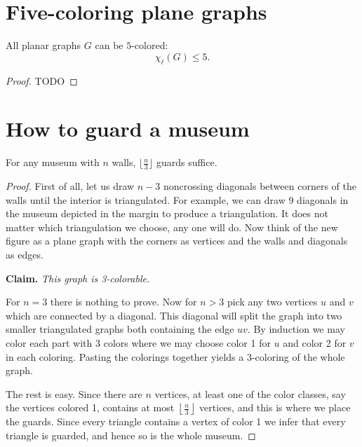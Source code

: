 \chapter{Five-coloring plane graphs}

\begin{theorem}
  \label{five_colorable}
  All planar graphs $G$ can be $5$-colored:
  \[
  \chi_{\ell}(G)\le 5.
  \]
\end{theorem}
\begin{proof}
  TODO
\end{proof}


\chapter{How to guard a museum}

\begin{theorem}
  \label{museum_guards}
  For any museum with $n$ walls, $\lfloor \frac{n}{3} \rfloor$ guards suffice.
\end{theorem}
\begin{proof}
  First of all, let us draw $n - 3$ noncrossing diagonals between corners of the walls until the
  interior is triangulated. For example, we can draw 9 diagonals in the museum depicted in the
  margin to produce a triangulation. It does not matter which triangulation we choose, any one
  will do. Now think of the new figure as a plane graph with the corners as vertices and the
   walls and diagonals as edges.

\textbf{Claim.} \textit{This graph is 3-colorable.}

For $n = 3$ there is nothing to prove. Now for $n > 3$ pick any two vertices $u$ and $v$ which are
connected by a diagonal. This diagonal will split the graph into two smaller triangulated graphs
both containing the edge $uv$. By induction we may color each part with 3 colors where we may
choose color 1 for $u$ and color 2 for $v$ in each coloring. Pasting the colorings together
yields a 3-coloring of the whole graph.

The rest is easy. Since there are $n$ vertices, at least one of the color classes, say the
 vertices colored 1, contains at most $\left\lfloor \frac{n}{3} \right\rfloor$ vertices, and
  this is where we place the guards. Since every triangle contains a vertex of color 1 we infer
  that every triangle is guarded, and hence so is the whole museum.

\end{proof}


